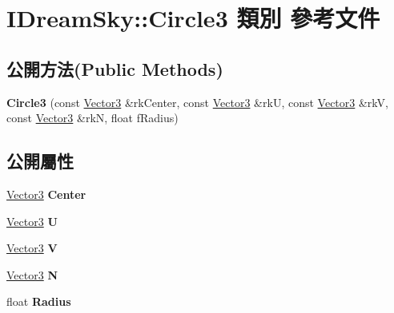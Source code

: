 \hypertarget{class_i_dream_sky_1_1_circle3}{}\section{I\+Dream\+Sky\+:\+:Circle3 類別 參考文件}
\label{class_i_dream_sky_1_1_circle3}
\subsection*{公開方法(Public Methods)}
\begin{DoxyCompactItemize}
\item 
{\bfseries Circle3} (const \hyperlink{class_i_dream_sky_1_1_vector3}{Vector3} \&rk\+Center, const \hyperlink{class_i_dream_sky_1_1_vector3}{Vector3} \&rkU, const \hyperlink{class_i_dream_sky_1_1_vector3}{Vector3} \&rkV, const \hyperlink{class_i_dream_sky_1_1_vector3}{Vector3} \&rkN, float f\+Radius)\hypertarget{class_i_dream_sky_1_1_circle3_a072dd11008f051a0a241f359418f4cd6}{}\label{class_i_dream_sky_1_1_circle3_a072dd11008f051a0a241f359418f4cd6}

\end{DoxyCompactItemize}
\subsection*{公開屬性}
\begin{DoxyCompactItemize}
\item 
\hyperlink{class_i_dream_sky_1_1_vector3}{Vector3} {\bfseries Center}\hypertarget{class_i_dream_sky_1_1_circle3_af6252330a9886eab43d3918bc04c1dd3}{}\label{class_i_dream_sky_1_1_circle3_af6252330a9886eab43d3918bc04c1dd3}

\item 
\hyperlink{class_i_dream_sky_1_1_vector3}{Vector3} {\bfseries U}\hypertarget{class_i_dream_sky_1_1_circle3_af66129ae82de6e4eeb47c4fd05263d6e}{}\label{class_i_dream_sky_1_1_circle3_af66129ae82de6e4eeb47c4fd05263d6e}

\item 
\hyperlink{class_i_dream_sky_1_1_vector3}{Vector3} {\bfseries V}\hypertarget{class_i_dream_sky_1_1_circle3_af753a6a1ffc9b45435b646a1c5fb9fe9}{}\label{class_i_dream_sky_1_1_circle3_af753a6a1ffc9b45435b646a1c5fb9fe9}

\item 
\hyperlink{class_i_dream_sky_1_1_vector3}{Vector3} {\bfseries N}\hypertarget{class_i_dream_sky_1_1_circle3_ad4a162722194662589c563812d9255c7}{}\label{class_i_dream_sky_1_1_circle3_ad4a162722194662589c563812d9255c7}

\item 
float {\bfseries Radius}\hypertarget{class_i_dream_sky_1_1_circle3_a48b4aacfe428f53484c52442a1708ba8}{}\label{class_i_dream_sky_1_1_circle3_a48b4aacfe428f53484c52442a1708ba8}

\end{DoxyCompactItemize}


